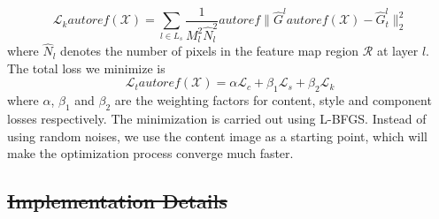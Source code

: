 \documentclass[10pt,twocolumn,letterpaper]{article}
\providecommand{\DIFdeltex}[1]{{\protect\color{red}\sout{#1}}}                      %
\providecommand{\DIFdelbegin}{} %
\providecommand{\DIFdel}[1]{\texorpdfstring{\DIFdeltex{#1}}{}} %
\begin{document}
\begin{equation}
\mathcal{L}_{k} autoref( \mathcal{X} ) = \sum\limits_{l \in {L_s}} {\frac{1}{{M_l^2{\hat N}_l^2}}autoref\| {{{\hat G}^l}autoref( \mathcal{X} ) - {\hat G}_t^l} \|_2^2} 
\label{eq:component_loss}
\end{equation}
where ${\hat N}_l$ denotes the number of pixels in the feature map region $\mathcal R$ at layer $l$. The total loss we minimize is 
\begin{equation}
\mathcal{L}_{t}autoref( \mathcal{X} ) = \alpha \mathcal{L}_{c} + \beta_1 \mathcal{L}_{s} + \beta_2 \mathcal{L}_{k}
\label{eq:Total_loss}
\end{equation}
where $\alpha$, $\beta_1$ and $\beta_2$ are the weighting factors for content, style and component losses respectively. The minimization is carried out using L-BFGS. Instead of using random noises, we use the content image as a starting point, which will make the optimization process converge much faster. 
\DIFdelbegin %

\subsection{\DIFdel{Implementation Details}}
\addtocounter{subsection}{-1}%
\end{document}
